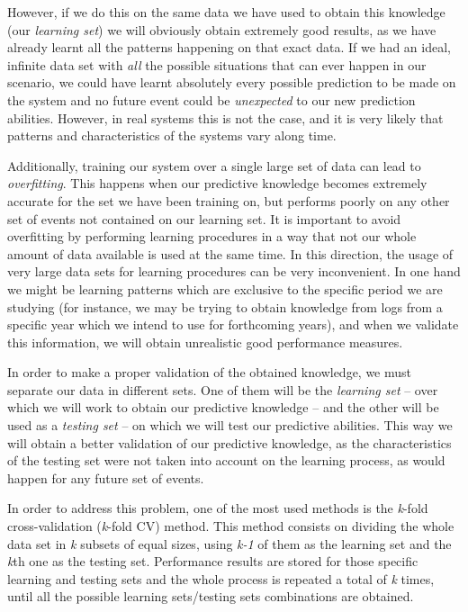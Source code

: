 \documentclass[a4paper,12pt]{article}
\begin{document}
However, if we do this on the same data we have used to obtain this knowledge (our \emph{learning set}) we will obviously obtain extremely good results, as we have already learnt all the patterns happening on that exact data. If we had an ideal, infinite data set with \emph{all} the possible situations that can ever happen in our scenario, we could have learnt absolutely every possible prediction to be made on the system and no future event could be \emph{unexpected} to our new prediction abilities. However, in real systems this is not the case, and it is very likely that patterns and characteristics of the systems vary along time. 

Additionally, training our system over a single large set of data can lead to \emph{overfitting}. This happens when our predictive knowledge becomes extremely accurate for the set we have been training on, but performs poorly on any other set of events not contained on our learning set. It is important to avoid overfitting by performing learning procedures in a way that not our whole amount of data available is used at the same time. In this direction, the usage of very large data sets for learning procedures can be very inconvenient. In one hand we might be learning patterns which are exclusive to the specific period we are studying (for instance, we may be trying to obtain knowledge from logs from a specific year which we intend to use for forthcoming years), and when we validate this information, we will obtain unrealistic good performance measures.

In order to make a proper validation of the obtained knowledge, we must separate our data in different sets. One of them will be the \emph{learning set} -- over which we will work to obtain our predictive knowledge -- and the other will be used as a \emph{testing set} -- on which we will test our predictive abilities. This way we will obtain a better validation of our predictive knowledge, as the characteristics of the testing set were not taken into account on the learning process, as  would happen for any future set of events.

In order to address this problem, one of the most used methods is the \textit{k}-fold cross-validation (\textit{k}-fold CV) method. This method consists on dividing the whole data set in \textit{k} subsets of equal sizes, using \textit{k-1} of them as the learning set and the \textit{k}th one as the testing set. Performance results are stored for those specific learning and testing sets and the whole process is repeated a total of \textit{k} times, until all the possible learning sets/testing sets combinations are obtained.
\end{document}
